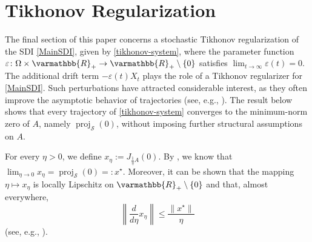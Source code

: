 \documentclass[11pt,reqno]{article}
\let\mathbb=\varmathbb
\renewcommand{\epsilon}{\varepsilon}
\newcommand{\1}{\mathds{1}}
\DeclareMathOperator{\proj}{proj}
\numberwithin{equation}{section}  %
\theoremstyle{plain}
\theoremstyle{definition}
\theoremstyle{remark}
\numberwithin{theorem}{section}
\numberwithin{remark}{section}
\numberwithin{example}{section}
\begin{document}
\section{Tikhonov Regularization}\label{Section6}
The final section of this paper concerns a stochastic Tikhonov regularization of the SDI
\eqref{MainSDI}, given by \eqref{tikhonov-system}, where the parameter function
$\epsilon\colon \Omega\times\mathbb{R}_+\to \mathbb{R}_+\setminus\{0\}$ satisfies
$\lim_{t\to\infty}\epsilon(t)=0$.
The additional drift term $-\epsilon(t)X_t$ plays the role of a Tikhonov regularizer for
\eqref{MainSDI}. Such perturbations have attracted considerable interest, as they often
improve the asymptotic behavior of trajectories (see, e.g.,
\cite{MR2462703, MR1398330}).
The result below shows that every trajectory of \eqref{tikhonov-system} converges to the
minimum-norm zero of $A$, namely $\proj_{\mathcal{S}}(0)$, without imposing further
structural assumptions on $A$.


For every $\eta>0$, we define $x_\eta := J_{\frac{1}{\eta}A}(0)$. By \cite[Theorem 23.48]{MR3616647},
we know that $\displaystyle\lim_{\eta\to 0} x_\eta = \proj_{\mathcal{S}}(0) =: x^\star$. Moreover, it
can be shown that the mapping $\eta \mapsto x_\eta$ is locally Lipschitz on
$\mathbb{R}_+ \setminus \{0\}$ and that, almost everywhere,
\begin{equation}\label{bound-derivative-curve1}
    \left\|\frac{d}{d\eta} x_\eta\right\| \leq \frac{\|x^\star\|}{\eta}
\end{equation}
(see, e.g., \cite[p.~529]{MR1398330}).
\end{document}
